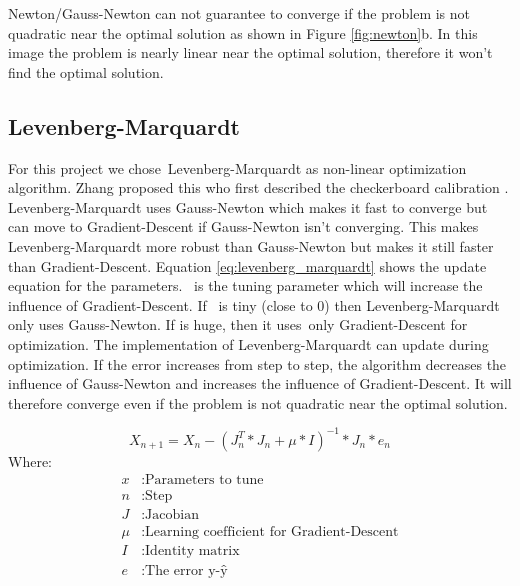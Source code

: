 \documentclass[11pt,a4paper,titlepage,oneside]{report}
\begin{document}
Newton/Gauss-Newton can not guarantee to converge if the problem is not quadratic near the optimal solution as shown in Figure \ref{fig:newton}b. In this image the problem is nearly linear near the optimal solution, therefore it won't find the optimal solution.

\subsection{Levenberg-Marquardt}
For this project we chose Levenberg-Marquardt as non-linear optimization algorithm. Zhang proposed this who first described the checkerboard calibration \cite{Zhang}. Levenberg-Marquardt uses Gauss-Newton which makes it fast to converge but can move to Gradient-Descent if Gauss-Newton isn't converging. This makes Levenberg-Marquardt more robust than Gauss-Newton but makes it still faster than Gradient-Descent. Equation \ref{eq:levenberg_marquardt} shows the update equation for the parameters. \mu\ is the tuning parameter which will increase the influence of Gradient-Descent. If \mu\ is tiny (close to 0) then Levenberg-Marquardt only uses Gauss-Newton. If \mu is huge, then it uses only Gradient-Descent for optimization. The implementation of Levenberg-Marquardt can update \mu during optimization. If the error increases from step to step, the algorithm decreases the influence of Gauss-Newton and increases the influence of Gradient-Descent. It will therefore converge even if the problem is not quadratic near the optimal solution.

\begin{equation}\label{eq:levenberg_marquardt}
  X_{n+1} = X_n - (J_n^T*J_n + \mu*I)^{-1}*J_n*e_n
\end{equation}
Where:
\begin{align*}
  x		  &: \text{Parameters to tune}\\
  n		  &: \text{Step}\\
  J		  &: \text{Jacobian}\\
  \mu	  &: \text{Learning coefficient for Gradient-Descent}\\
  I     &: \text{Identity matrix}\\
  e  	  &: \text{The error y-ŷ}
\end{align*}
\end{document}
